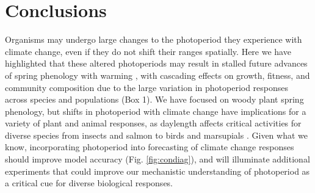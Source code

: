 \documentclass{article}
\begin{document}
\section*{Conclusions}
Organisms may undergo large changes to the photoperiod they experience with climate change, even if they do not shift their ranges spatially. Here we have highlighted that these altered photoperiods may result in stalled future advances of spring phenology with warming \cite[e.g., Table S1,][]{fu2019, gusewell2017,yu2010}, with cascading effects on growth, fitness, and community composition due to the large variation in photoperiod responses across species and populations (Box 1). We have focused on woody plant spring phenology, but shifts in photoperiod with climate change have implications for a variety of plant and animal responses, as daylength affects critical activities for diverse species from insects \citep{bradshaw2006} and salmon \citep{taranger2003} to birds \citep{dawson2001} and marsupials \citep{mcallan2006}. Given what we know, incorporating photoperiod into forecasting of climate change responses should improve model accuracy (Fig. \ref{fig:condiag}), and will illuminate additional experiments that could improve our mechanistic understanding of photoperiod as a critical cue for diverse biological responses. 
\end{document}
